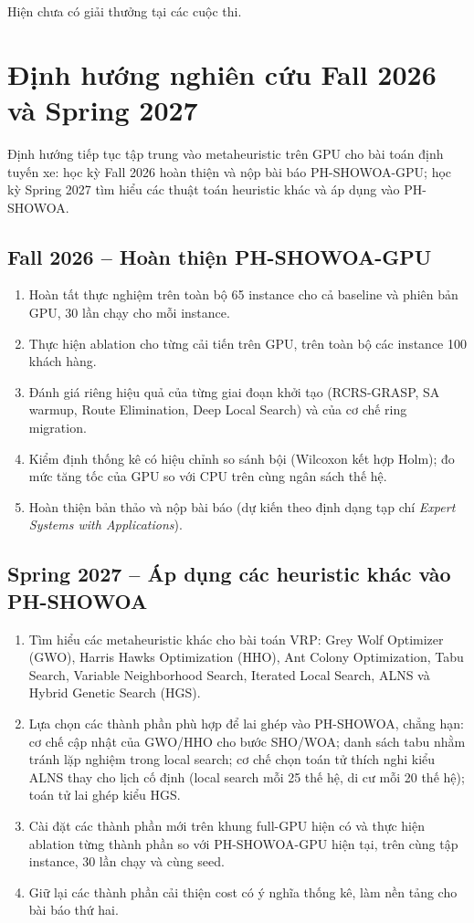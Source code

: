 \documentclass[12pt,a4paper]{article}
\begin{document}
Hiện chưa có giải thưởng tại các cuộc thi.

\section{Định hướng nghiên cứu Fall 2026 và Spring 2027}

Định hướng tiếp tục tập trung vào metaheuristic trên GPU cho bài toán định tuyến xe: học kỳ Fall 2026 hoàn thiện và nộp bài báo PH-SHOWOA-GPU; học kỳ Spring 2027 tìm hiểu các thuật toán heuristic khác và áp dụng vào PH-SHOWOA.

\subsection*{Fall 2026 -- Hoàn thiện PH-SHOWOA-GPU}

\begin{enumerate}
  \item Hoàn tất thực nghiệm trên toàn bộ 65 instance cho cả baseline và phiên bản GPU, 30 lần chạy cho mỗi instance.
  \item Thực hiện ablation cho từng cải tiến trên GPU, trên toàn bộ các instance 100 khách hàng.
  \item Đánh giá riêng hiệu quả của từng giai đoạn khởi tạo (RCRS-GRASP, SA warmup, Route Elimination, Deep Local Search) và của cơ chế ring migration.
  \item Kiểm định thống kê có hiệu chỉnh so sánh bội (Wilcoxon kết hợp Holm); đo mức tăng tốc của GPU so với CPU trên cùng ngân sách thế hệ.
  \item Hoàn thiện bản thảo và nộp bài báo (dự kiến theo định dạng tạp chí \textit{Expert Systems with Applications}).
\end{enumerate}

\subsection*{Spring 2027 -- Áp dụng các heuristic khác vào PH-SHOWOA}

\begin{enumerate}
  \item Tìm hiểu các metaheuristic khác cho bài toán VRP: Grey Wolf Optimizer (GWO), Harris Hawks Optimization (HHO), Ant Colony Optimization, Tabu Search, Variable Neighborhood Search, Iterated Local Search, ALNS và Hybrid Genetic Search (HGS).
  \item Lựa chọn các thành phần phù hợp để lai ghép vào PH-SHOWOA, chẳng hạn: cơ chế cập nhật của GWO/HHO cho bước SHO/WOA; danh sách tabu nhằm tránh lặp nghiệm trong local search; cơ chế chọn toán tử thích nghi kiểu ALNS thay cho lịch cố định (local search mỗi 25 thế hệ, di cư mỗi 20 thế hệ); toán tử lai ghép kiểu HGS.
  \item Cài đặt các thành phần mới trên khung full-GPU hiện có và thực hiện ablation từng thành phần so với PH-SHOWOA-GPU hiện tại, trên cùng tập instance, 30 lần chạy và cùng seed.
  \item Giữ lại các thành phần cải thiện cost có ý nghĩa thống kê, làm nền tảng cho bài báo thứ hai.
\end{enumerate}
\end{document}
